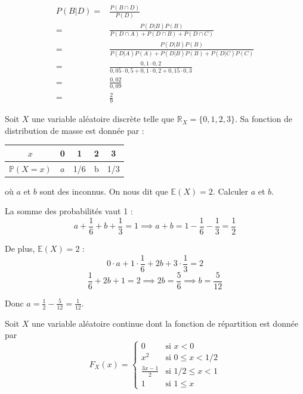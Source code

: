 \begin{questions}
\begin{solution}
\begin{align*}
    P(B|D) = & \frac{P(B\cap D)}{P(D)}\\
    =& \frac{P(D|B)P(B)}{P(D\cap A)+P(D\cap B) + P(D\cap C)}\\
    =&\frac{P(D|B)P(B)}{P(D| A)P(A)+P(D|B)P(B) + P(D| C)P(C)}\\
    =&\frac{0,1 \cdot 0,2}{0,05\cdot 0,5 + 0,1 \cdot 0,2 + 0,15 \cdot 0,3}\\
    =& \frac{0,02}{0,09}\\
    =& \frac{2}{9}
\end{align*}
\end{solution}
\newpage
\question[6] Soit $X$ une variable aléatoire discrète telle que $\mathbb{R}_X=\{0,1,2,3\}$. Sa fonction de distribution  de masse est donnée par :
\begin{center}
\begin{tabular}{ |c|c|c|c|c| } 
 \hline
 $x$ & 0 & 1 & 2 & 3 \\
 \hline
 $\mathbb{P}(X=x)$ & $a$ & 1/6 & b & 1/3 \\
 \hline
 \end{tabular}
 \end{center}
 où $a$ et $b$ sont des inconnus.
On nous dit que $\mathbb{E}(X)=2$. Calculer $a$ et $b$.

\begin{solution}
La somme des probabilités vaut 1 :
$$a + \frac{1}{6} + b + \frac{1}{3} = 1 \implies a + b = 1 - \frac{1}{6} - \frac{1}{3} = \frac{1}{2}$$

De plus, $\mathbb{E}(X) = 2$ :
$$0 \cdot a + 1 \cdot \frac{1}{6} + 2b + 3 \cdot \frac{1}{3} = 2$$
$$\frac{1}{6} + 2b + 1 = 2 \implies 2b = \frac{5}{6} \implies b = \frac{5}{12}$$

Donc $a = \frac{1}{2} - \frac{5}{12} = \frac{1}{12}$.
\end{solution}

\newpage
\question Soit $X$ une variable aléatoire continue dont la fonction de répartition est donnée par
\[ F_X(x) = \begin{cases}
\displaystyle 0 & \mbox{si } x < 0 \\
\displaystyle x^2 & \mbox{si } 0 \le x < 1/2 \\
\displaystyle \frac{3x-1}{2} & \mbox{si } 1/2 \le x < 1 \\
\displaystyle 1 & \mbox{si } 1 \le x
\end{cases} \]

\end{questions}
